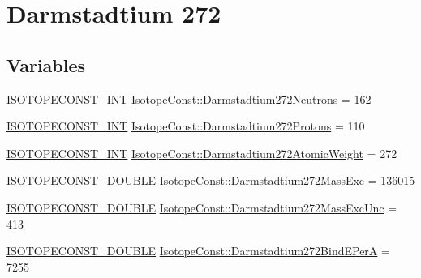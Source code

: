 \hypertarget{group___isotope_const-_darmstadtium-_ds272}{}\section{Darmstadtium 272}
\label{group___isotope_const-_darmstadtium-_ds272}
\subsection*{Variables}
\begin{DoxyCompactItemize}
\item 
\mbox{\hyperlink{group___isotope_const-_macros_ga5f18360b3e99483a35c32d789e62621c}{I\+S\+O\+T\+O\+P\+E\+C\+O\+N\+S\+T\+\_\+\+I\+NT}} \mbox{\hyperlink{group___isotope_const-_darmstadtium-_ds272_ga94873fd94e5256328cf78ccdf717cfd7}{Isotope\+Const\+::\+Darmstadtium272\+Neutrons}} = 162
\item 
\mbox{\hyperlink{group___isotope_const-_macros_ga5f18360b3e99483a35c32d789e62621c}{I\+S\+O\+T\+O\+P\+E\+C\+O\+N\+S\+T\+\_\+\+I\+NT}} \mbox{\hyperlink{group___isotope_const-_darmstadtium-_ds272_ga77072983a8741e42e7ada1727c047e9d}{Isotope\+Const\+::\+Darmstadtium272\+Protons}} = 110
\item 
\mbox{\hyperlink{group___isotope_const-_macros_ga5f18360b3e99483a35c32d789e62621c}{I\+S\+O\+T\+O\+P\+E\+C\+O\+N\+S\+T\+\_\+\+I\+NT}} \mbox{\hyperlink{group___isotope_const-_darmstadtium-_ds272_ga5e2d5c21ce19f13fffb3f4e29407f6f7}{Isotope\+Const\+::\+Darmstadtium272\+Atomic\+Weight}} = 272
\item 
\mbox{\hyperlink{group___isotope_const-_macros_ga8f45a7272ce02c0b4c65c44636ed719a}{I\+S\+O\+T\+O\+P\+E\+C\+O\+N\+S\+T\+\_\+\+D\+O\+U\+B\+LE}} \mbox{\hyperlink{group___isotope_const-_darmstadtium-_ds272_ga219a7f081bc878412ee93c94bae564d1}{Isotope\+Const\+::\+Darmstadtium272\+Mass\+Exc}} = 136015
\item 
\mbox{\hyperlink{group___isotope_const-_macros_ga8f45a7272ce02c0b4c65c44636ed719a}{I\+S\+O\+T\+O\+P\+E\+C\+O\+N\+S\+T\+\_\+\+D\+O\+U\+B\+LE}} \mbox{\hyperlink{group___isotope_const-_darmstadtium-_ds272_gac0844efbf45c4c605e69721546b4f661}{Isotope\+Const\+::\+Darmstadtium272\+Mass\+Exc\+Unc}} = 413
\item 
\mbox{\hyperlink{group___isotope_const-_macros_ga8f45a7272ce02c0b4c65c44636ed719a}{I\+S\+O\+T\+O\+P\+E\+C\+O\+N\+S\+T\+\_\+\+D\+O\+U\+B\+LE}} \mbox{\hyperlink{group___isotope_const-_darmstadtium-_ds272_gae16a813ccf6e0adac2a930d38128c87c}{Isotope\+Const\+::\+Darmstadtium272\+Bind\+E\+PerA}} = 7255

\end{DoxyCompactItemize}
